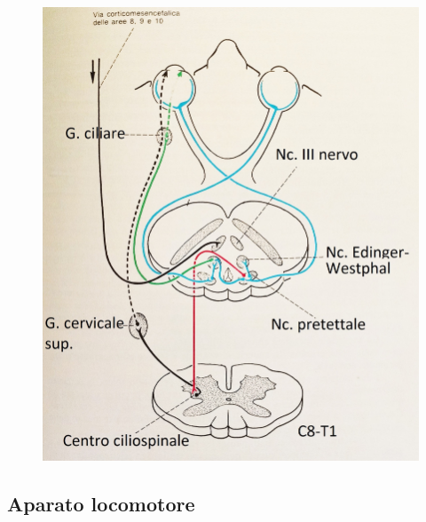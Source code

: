 \begin{figure}[h!]
\begin{minipage}{.5\textwidth}
  \includegraphics[scale=0.09]{source/immagini/via_discendente.jpg}
  \label{fig:test2}
\end{minipage}
\end{figure}

\subsection{Aparato locomotore}

